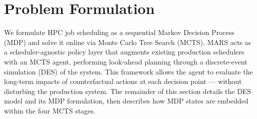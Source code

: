 \documentclass[conference]{IEEEtran}
\begin{document}

\section{Problem Formulation}
\label{sec:problem_formulation}

We formulate HPC job scheduling as a sequential Markov Decision Process (MDP) and solve it online via Monte Carlo Tree Search (MCTS). MARS acts as a scheduler-agnostic policy layer that augments existing production schedulers with an MCTS agent, performing look-ahead planning through a discrete-event simulation (DES) of the system. 
This framework allows the agent to evaluate the long-term impacts of counterfactual actions at each decision point — without disturbing the production system. 
The remainder of this section details the DES model and its MDP formulation, then describes how MDP states are embedded within the four MCTS stages.
\end{document}
